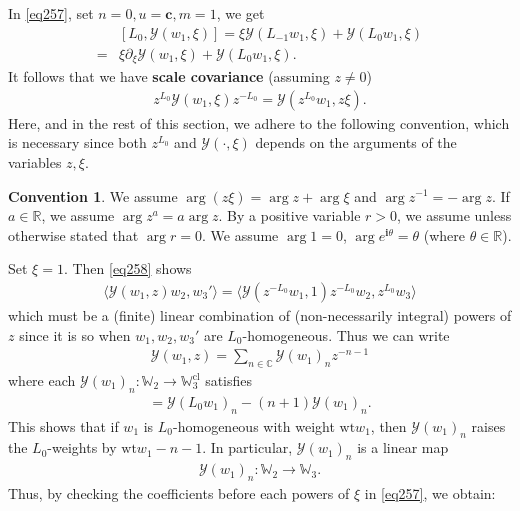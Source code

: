 \documentclass[12pt,a4paper,notitlepage]{article}
\theoremstyle{definition}
\newtheorem{cv}[df]{Convention}
\theoremstyle{plain}
\newcommand{\mc}{\mathcal}
\newcommand{\bk}[1]{\langle {#1}\rangle}
\newcommand{\im}{\mathbf{i}}
\newcommand{\Wbb}{\mathbb W}
\newcommand{\Cbb}{\mathbb C}
\newcommand{\Rbb}{\mathbb R}
\newcommand{\cbf}{\mathbf c}
\newcommand{\wt}{\mathrm{wt}}
\newcommand{\cl}{\mathrm{cl}}
\numberwithin{equation}{section}
\begin{document}
In \eqref{eq257}, set $n=0,u=\cbf,m=1$, we get
\begin{align*}
&[L_0,\mc Y(w_1,\xi)]=\xi\mc Y(L_{-1}w_1,\xi)+\mc Y(L_0w_1,\xi)\\
=&\xi\partial_\xi \mc Y(w_1,\xi)+\mc Y(L_0w_1,\xi).
\end{align*}
It follows that we have \textbf{scale covariance} (assuming $ z\neq 0$)
\begin{align}
 z^{L_0}\mc Y(w_1,\xi) z^{-L_0}=\mc Y( z^{L_0}w_1, z\xi).\label{eq258}
\end{align}
Here, and in the rest of this section, we adhere to the following convention, which is necessary since both $ z^{L_0}$ and $\mc Y(\cdot,\xi)$ depends on the arguments of the variables $ z,\xi$.
\begin{cv}\label{lb183}
We assume $\arg( z\xi)=\arg z+\arg\xi$ and $\arg z^{-1}=-\arg z$. If $a\in\Rbb$, we assume $\arg z^a=a\arg z$. By a positive variable $r>0$, we assume unless otherwise stated that $\arg r=0$. We assume $\arg 1=0$, $\arg e^{\im\theta}=\theta$ (where $\theta\in\Rbb$).
\end{cv}
Set $\xi=1$. Then \eqref{eq258} shows
\begin{align}
\bk{\mc Y(w_1,z)w_2,w_3'}=\bk{\mc Y(z^{-L_0}w_1,1)z^{-L_0}w_2,z^{L_0}w_3}
\end{align}
which must be a (finite) linear combination of (non-necessarily integral) powers of $z$ since it is so when $w_1,w_2,w_3'$ are $L_0$-homogeneous. Thus we can write
\begin{align*}
\mc Y(w_1,z)=\sum_{n\in\Cbb}\mc Y(w_1)_nz^{-n-1}
\end{align*}
where each $\mc Y(w_1)_n:\Wbb_2\rightarrow\Wbb_3^\cl$ satisfies
\begin{align}
[L_0,\mc Y(w_1)_n]=\mc Y(L_0w_1)_n-(n+1)\mc Y(w_1)_n.
\end{align}
This shows that if $w_1$ is $L_0$-homogeneous with weight $\wt w_1$, then $\mc Y(w_1)_n$ raises the $L_0$-weights by $\wt w_1-n-1$. In particular, $\mc Y(w_1)_n$ is a linear map
\begin{align*}
\mc Y(w_1)_n:\Wbb_2\rightarrow\Wbb_3.
\end{align*}
Thus, by checking the coefficients before each powers of $\xi$ in \eqref{eq257}, we obtain:
\end{document}
